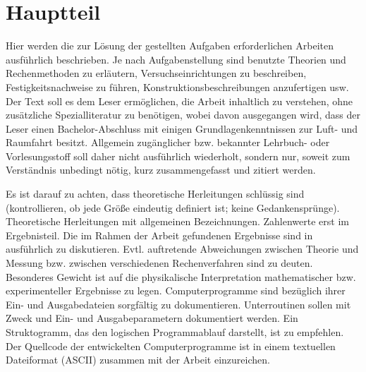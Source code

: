 \chapter{Hauptteil}
\label{sec:hauptteil}

Hier werden die zur Lösung der gestellten Aufgaben erforderlichen Arbeiten ausführlich beschrieben.
Je nach Aufgabenstellung sind benutzte Theorien und Rechenmethoden zu erläutern, 
Versuchseinrichtungen zu beschreiben, Festigkeitsnachweise zu führen, Konstruktionsbeschreibungen anzufertigen usw.
Der Text soll es dem Leser ermöglichen, die Arbeit inhaltlich zu verstehen, ohne zusätzliche Spezialliteratur 
zu benötigen, wobei davon ausgegangen wird, dass der Leser einen Bachelor-Abschluss mit einigen Grundlagenkenntnissen 
zur Luft- und Raumfahrt besitzt. Allgemein zugänglicher bzw. bekannter Lehrbuch- oder Vorlesungsstoff soll daher nicht
ausführlich wiederholt, sondern nur, soweit zum Verständnis unbedingt nötig, kurz zusammengefasst und zitiert werden. 

Es ist darauf zu achten, dass theoretische Herleitungen schlüssig sind (kontrollieren, ob jede Größe
eindeutig definiert ist; keine Gedankensprünge). Theoretische Herleitungen mit allgemeinen Bezeichnungen. 
Zahlenwerte erst im Ergebnisteil. Die im Rahmen der Arbeit gefundenen Ergebnisse sind in  ausführlich zu diskutieren. 
Evtl. auftretende Abweichungen zwischen Theorie und Messung bzw. zwischen verschiedenen Rechenverfahren
sind zu deuten. Besonderes Gewicht ist auf die physikalische Interpretation mathematischer bzw. experimenteller 
Ergebnisse zu legen. Computerprogramme sind bezüglich ihrer Ein- und Ausgabedateien sorgfältig zu dokumentieren.
Unterroutinen sollen mit Zweck und Ein- und Ausgabeparametern dokumentiert werden. 
Ein Struktogramm, das den logischen Programmablauf darstellt, ist zu empfehlen. Der Quellcode der entwickelten 
Computerprogramme ist in einem textuellen Dateiformat (ASCII) zusammen mit der Arbeit einzureichen. 

